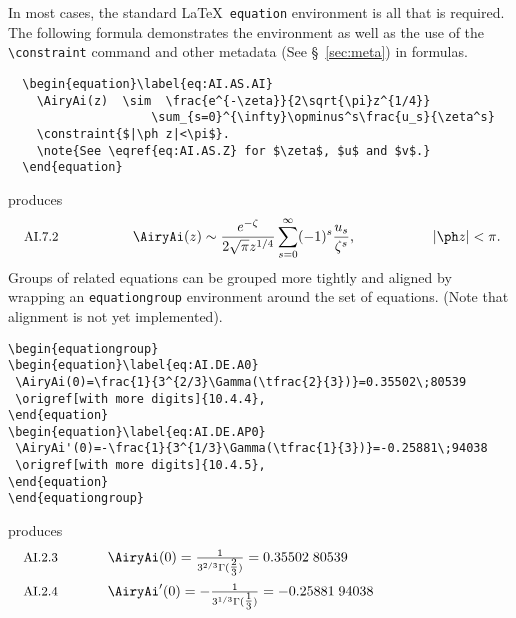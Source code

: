 \documentclass[twoside]{article}
\newcommand{\token}[1]{\texttt{#1}}
\begin{document}
In most cases, the standard \LaTeX\ \token{equation} environment
is all that is required.  The following formula demonstrates the environment
as well as the use of the \verb|\constraint| command and other
 metadata (See \S~\ref{sec:meta}) in formulas.
\begin{verbatim}
  \begin{equation}\label{eq:AI.AS.AI}
    \AiryAi(z)  \sim  \frac{e^{-\zeta}}{2\sqrt{\pi}z^{1/4}}
                    \sum_{s=0}^{\infty}\opminus^s\frac{u_s}{\zeta^s}
    \constraint{$|\ph z|<\pi$}.
    \note{See \eqref{eq:AI.AS.Z} for $\zeta$, $u$ and $v$.}
  \end{equation}
\end{verbatim}
produces
\[
\hbox to \textwidth{
{\small AI.7.2}\hfill
 $\displaystyle \AiryAi(z)  \sim  \frac{e^{-\zeta}}{2\sqrt{\pi}z^{1/4}}
                  \sum_{s=0}^{\infty}\opminus^s\frac{u_s}{\zeta^s}$,
 \hfill
 $|\ph z|<\pi$.}
\]
Groups of related equations can be grouped more tightly and 
aligned by wrapping an \token{equationgroup} environment around the set of equations.
(Note that alignment is not yet implemented).
\begin{verbatim}
\begin{equationgroup}
\begin{equation}\label{eq:AI.DE.A0}
 \AiryAi(0)=\frac{1}{3^{2/3}\Gamma(\tfrac{2}{3})}=0.35502\;80539
 \origref[with more digits]{10.4.4},
\end{equation}
\begin{equation}\label{eq:AI.DE.AP0}
 \AiryAi'(0)=-\frac{1}{3^{1/3}\Gamma(\tfrac{1}{3})}=-0.25881\;94038
 \origref[with more digits]{10.4.5},
\end{equation}
\end{equationgroup}
\end{verbatim}
produces
\[
\vbox{
\hbox to \textwidth{
\hbox to 0pt {\small AI.2.3}\hspace{2cm}
  $\AiryAi(0)  =  \frac{1}{3^{2/3}\Gamma(\tfrac{2}{3})} =  0.35502\;80539$
\hfill}
\vskip5pt
\hbox to \textwidth{
\hbox to 0pt {\small AI.2.4}\hspace{2cm}
  $\AiryAi'(0) =  -\frac{1}{3^{1/3}\Gamma(\tfrac{1}{3})} = -0.25881\;94038$
\hfill}}
\]
\end{document}

